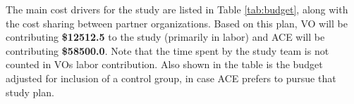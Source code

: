\documentclass{tufte-handout}
\newcommand{\les}[0]{\textsc{LES}}%
\newcommand{\totalrequest}[0]{\textsc{58500.0}}
\newcommand{\totalvo}[0]{\textsc{12512.5}}
\begin{document}
The main cost drivers for the study are listed in Table \ref{tab:budget}, along
with the cost sharing between partner organizations. Based on this plan,
VO will be contributing \textbf{\$\totalvo} to the study (primarily in labor) 
and ACE will be contributing \textbf{\$\totalrequest}. Note that the time spent 
by the study team is not counted in VOs labor contribution. Also shown in
the table is the budget adjusted for inclusion of a control group, in case
ACE prefers to pursue that study plan.

\end{document}
